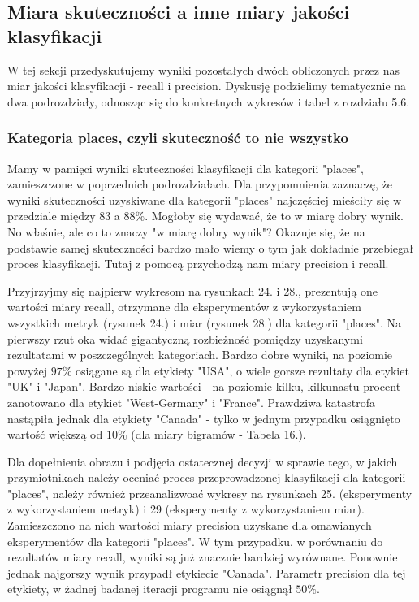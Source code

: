 \documentclass{classrep}
\begin{document}
\subsection{Miara skuteczności a inne miary jakości klasyfikacji}
W tej sekcji przedyskutujemy wyniki pozostałych dwóch obliczonych przez nas miar jakości klasyfikacji - recall i precision. Dyskusję podzielimy tematycznie na dwa podrozdziały, odnosząc się do konkretnych wykresów i tabel z rozdziału 5.6.\newline

\subsubsection{Kategoria places, czyli skuteczność to nie wszystko}
Mamy w pamięci wyniki skuteczności klasyfikacji dla kategorii "places", zamieszczone w poprzednich podrozdziałach. Dla przypomnienia zaznaczę, że wyniki skuteczności uzyskiwane dla kategorii "places" najczęściej mieściły się w przedziale między $83$ a $88\%$. Mogłoby się wydawać, że to w miarę dobry wynik. No właśnie, ale co to znaczy "w miarę dobry wynik"? Okazuje się, że na podstawie samej skuteczności bardzo mało wiemy o tym jak dokładnie przebiegał proces klasyfikacji. Tutaj z pomocą przychodzą nam miary precision i recall. \newline

Przyjrzyjmy się najpierw wykresom na rysunkach 24. i 28., prezentują one wartości miary recall, otrzymane dla eksperymentów z wykorzystaniem wszystkich metryk (rysunek 24.) i miar (rysunek 28.) dla kategorii "places". Na pierwszy rzut oka widać gigantyczną rozbieżność pomiędzy uzyskanymi rezultatami w poszczególnych kategoriach. Bardzo dobre wyniki, na poziomie powyżej $97\%$ osiągane są dla etykiety "USA", o wiele gorsze rezultaty dla etykiet "UK" i "Japan". Bardzo niskie wartości - na poziomie kilku, kilkunastu procent zanotowano dla etykiet "West-Germany" i "France". Prawdziwa katastrofa nastąpiła jednak dla etykiety "Canada" - tylko w jednym przypadku osiągnięto wartość większą od $10\%$ (dla miary bigramów - Tabela 16.).\newline

Dla dopełnienia obrazu i podjęcia ostatecznej decyzji w sprawie tego, w jakich przymiotnikach należy oceniać proces przeprowadzonej klasyfikacji dla kategorii "places", należy również przeanalizwoać wykresy na rysunkach 25. (eksperymenty z wykorzystaniem metryk) i 29 (eksperymenty z wykorzystaniem miar). Zamieszczono na nich wartości miary precision uzyskane dla omawianych eksperymentów dla kategorii "places". W tym przypadku, w porównaniu do rezultatów miary recall, wyniki są już znacznie bardziej wyrównane. Ponownie jednak najgorszy wynik przypadł etykiecie "Canada". Parametr precision dla tej etykiety, w żadnej badanej iteracji programu nie osiągnął $50\%$.\newline 
\end{document}
